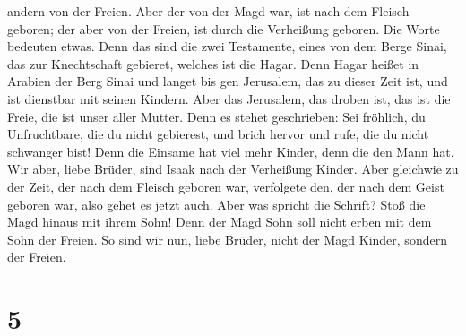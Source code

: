 andern von der Freien.  Aber der von der Magd war, ist nach
dem Fleisch geboren; der aber von der Freien, ist durch die Verheißung
geboren.  Die Worte bedeuten etwas. Denn das sind die zwei
Testamente, eines von dem Berge Sinai, das zur Knechtschaft gebieret,
welches ist die Hagar.  Denn Hagar heißet in Arabien der
Berg Sinai und langet bis gen Jerusalem, das zu dieser Zeit ist, und ist
dienstbar mit seinen Kindern.  Aber das Jerusalem, das
droben ist, das ist die Freie, die ist unser aller Mutter. 
Denn es stehet geschrieben: Sei fröhlich, du Unfruchtbare, die du nicht
gebierest, und brich hervor und rufe, die du nicht schwanger bist! Denn
die Einsame hat viel mehr Kinder, denn die den Mann hat. 
Wir aber, liebe Brüder, sind Isaak nach der Verheißung Kinder.
 Aber gleichwie zu der Zeit, der nach dem Fleisch geboren
war, verfolgete den, der nach dem Geist geboren war, also gehet es jetzt
auch.  Aber was spricht die Schrift? Stoß die Magd hinaus
mit ihrem Sohn! Denn der Magd Sohn soll nicht erben mit dem Sohn der
Freien.  So sind wir nun, liebe Brüder, nicht der Magd
Kinder, sondern der Freien.

\hypertarget{section-4}{%
\section{5}\label{section-4}}

